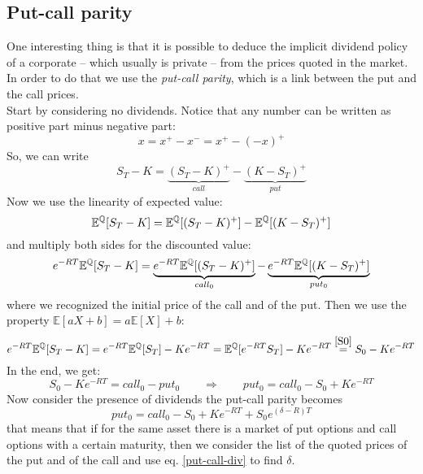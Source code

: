 \subsection{Put-call parity}\label{putcallparity}
One interesting thing is that it is possible to deduce the implicit dividend policy of a corporate -- which usually is private -- from the prices quoted in the market. In order to do that we use the \emph{put-call parity}, which is a link between the put and the call prices. \\
Start by considering no dividends. Notice that any number can be written as positive part minus negative part:
\begin{equation*}
    x = x^+ - x^- = x^+ - (-x)^+ 
\end{equation*}
So, we can write
\begin{equation}
    S_T - K = \underbrace{(S_T - K)^+}_{call} - \underbrace{(K - S_T)^+}_{put}
\end{equation}
Now we use the linearity of expected value:
\begin{equation*}
    \mathbb{E}^{\mathbb{Q}}[S_T-K] = \mathbb{E}^{\mathbb{Q}}[(S_T-K)^+] - \mathbb{E}^{\mathbb{Q}}[(K-S_T)^+]
\end{equation*}
and multiply both sides for the discounted value:
\begin{equation*}
    e^{-RT}\mathbb{E}^{\mathbb{Q}}[S_T-K] = \underbrace{e^{-RT}\mathbb{E}^{\mathbb{Q}}[(S_T-K)^+]}_{call_0} - 
    \underbrace{e^{-RT}\mathbb{E}^{\mathbb{Q}}[(K-S_T)^+]}_{put_0}
\end{equation*}
where we recognized the initial price of the call and of the put. Then we use the property ${\mathbb{E}}[aX+b]=a{\mathbb{E}}[X]+b$:
\begin{equation*}
    e^{-RT}\mathbb{E}^{\mathbb{Q}}[S_T-K] = e^{-RT}\mathbb{E}^{\mathbb{Q}}[S_T] - Ke^{-RT} = \mathbb{E}^{\mathbb{Q}}[e^{-RT}S_T] - Ke^{-RT} \overset{\eqref{S0}}{=} S_0 - Ke^{-RT}
\end{equation*}
In the end, we get:
\begin{equation}\label{put-call}
    S_0 - Ke^{-RT} = call_0 - put_0 \qquad\Rightarrow\qquad put_0 = call_0 - S_0 +  Ke^{-RT}
\end{equation}
Now consider the presence of dividends the put-call parity becomes
\begin{equation}\label{put-call-div}
    put_0 = call_0 - S_0 +  Ke^{-RT} + S_0e^{(\delta - R)T}
\end{equation}
that means that if for the same asset there is a market of put options and call options with a certain maturity, then we consider the list of the quoted prices of the put and of the call and use eq. \eqref{put-call-div} to find $\delta$.

